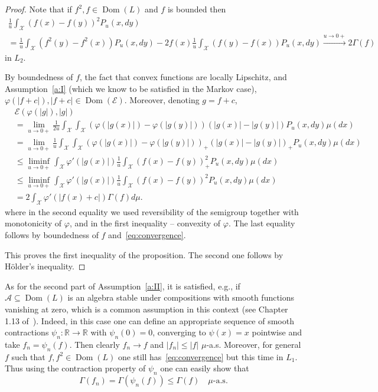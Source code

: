 \documentclass[a4paper]{amsart}
\theoremstyle{definition}
\theoremstyle{remark}
\numberwithin{equation}{section}
\newcommand*{\RR}{\mathbb{R}}
\newcommand{\calX}{\mathcal{X}}
\newcommand*{\calA}{\mathcal{A}}
\DeclareMathOperator{\Dom}{Dom} %
\newcommand*{\calE}{\mathcal{E}}
\begin{document}
\begin{proof}
Note that if $f^2, f \in \Dom(L)$ and $f$ is bounded then
\begin{multline}\label{eq:convergence}
\frac{1}{u} \int_\calX (f(x) - f(y))^2 P_u(x,dy)\\
 = \frac{1}{u} \int_\calX (f^2(y) - f^2(x)) P_u(x,dy) - 2f(x) \frac{1}{u} \int_\calX (f(y) - f(x))P_u(x,dy) \stackrel{u\to 0+}{\to} 2\Gamma(f)
\end{multline}
in $L_2$.

By boundedness of $f$, the fact that convex functions are locally Lipschitz, and Assumption~\ref{a:I} (which we know to be satisfied in the Markov case), $\varphi(|f+c|), |f+c| \in \Dom(\calE)$. Moreover, denoting $g=f+c$,
\begin{align*}
&\calE(\varphi(|g|),|g|) \\
&= \lim_{u\to 0+} \frac{1}{2u}\int_\calX\int_\calX (\varphi(|g(x)|) - \varphi(|g(y)|))(|g(x)| - |g(y)|)P_u(x,dy)\mu(dx) \\
&= \lim_{u\to 0+} \frac{1}{u}\int_\calX\int_\calX (\varphi(|g(x)|) - \varphi(|g(y)|))_+(|g(x)| - |g(y)|)_+ P_{u}(x,dy)\mu(dx) \\
&\le \liminf_{u\to 0+}  \int_\calX \varphi'(|g(x)|) \frac{1}{u} \int_\calX (f(x) - f(y))_+^2P_{u}(x,dy)\mu(dx)\\
&\le \liminf_{u\to 0+}  \int_\calX \varphi'(|g(x)|) \frac{1}{u} \int_\calX (f(x) - f(y))^2P_{u}(x,dy)\mu(dx)\\
&= 2 \int_\calX \varphi'(|f(x)+c|) \Gamma(f)d\mu.
\end{align*}
where in the second equality we used reversibility of the semigroup together with monotonicity of $\varphi$, and in the first inequality -- convexity of $\varphi$. The last equality follows by boundedness of $f$ and~\eqref{eq:convergence}.

This proves the first inequality of the proposition. The second one follows by H\"older's inequality.
\end{proof}

As for the second part of Assumption~\ref{a:II}, it is satisfied, e.g., if $\calA \subseteq \Dom(L)$ is an algebra stable under compositions with smooth functions vanishing at zero, which is a common assumption in this context (see Chapter 1.13 of~\cite{MR3155209}). Indeed, in this case one can define an appropriate sequence of smooth contractions $\psi_n\colon \RR\to \RR$ with $\psi_n(0) = 0$, converging to $\psi(x) = x$ pointwise
and take $f_n = \psi_n(f)$. Then clearly $f_n \to f$ and $|f_n|\le |f|$ $\mu$-a.s.
 Moreover, for general $f$ such that $f,f^2\in \Dom(L)$ one still has~\eqref{eq:convergence} but this time in $L_1$. Thus using the contraction property of $\psi_n$ one can easily show that
\begin{displaymath}
  \Gamma(f_n) = \Gamma(\psi_n(f)) \le \Gamma(f)
  \quad
  \mu\text{-a.s.}
\end{displaymath}
\end{document}
